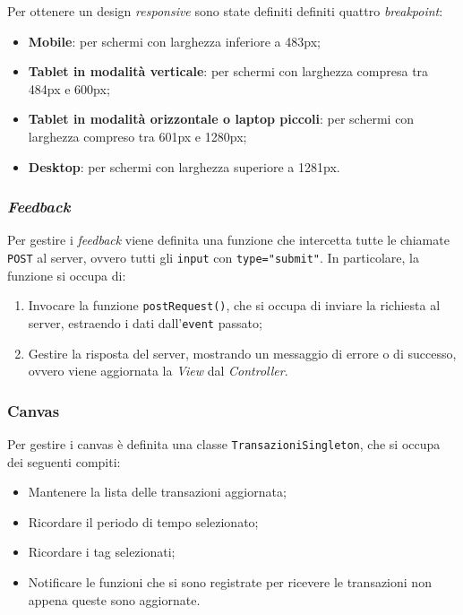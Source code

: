 Per ottenere un design \textit{responsive} sono state definiti definiti quattro 
\textit{breakpoint}:
\begin{itemize}
	\item \textbf{Mobile}: per schermi con larghezza inferiore a 483px;

	\item \textbf{Tablet in modalità verticale}: per schermi con larghezza 
		compresa tra 484px e 600px;

	\item \textbf{Tablet in modalità orizzontale o laptop piccoli}: per schermi 
		con larghezza compreso tra 601px e 1280px;

	\item \textbf{Desktop}: per schermi con larghezza superiore a 1281px.
\end{itemize}

\subsubsection{\textit{Feedback}}

Per gestire i \textit{feedback} viene definita una funzione che intercetta tutte
le chiamate \texttt{POST} al server, ovvero tutti gli \texttt{input} con 
\texttt{type="submit"}. In particolare, la funzione si occupa di:
\begin{enumerate}
	\item Invocare la funzione \texttt{postRequest()}, che si occupa di inviare
		la richiesta al server, estraendo i dati dall'\texttt{event} passato;

	\item Gestire la risposta del server, mostrando un messaggio di errore o di
		successo, ovvero viene aggiornata la \textit{View} dal 
		\textit{Controller}.
\end{enumerate}

\subsubsection{Canvas}

Per gestire i canvas è definita una classe \texttt{TransazioniSingleton}, che si
occupa dei seguenti compiti:
\begin{itemize}
	\item Mantenere la lista delle transazioni aggiornata;

	\item Ricordare il periodo di tempo selezionato;

	\item Ricordare i tag selezionati;

	\item Notificare le funzioni che si sono registrate per ricevere le 
		transazioni non appena queste sono aggiornate.
\end{itemize}

